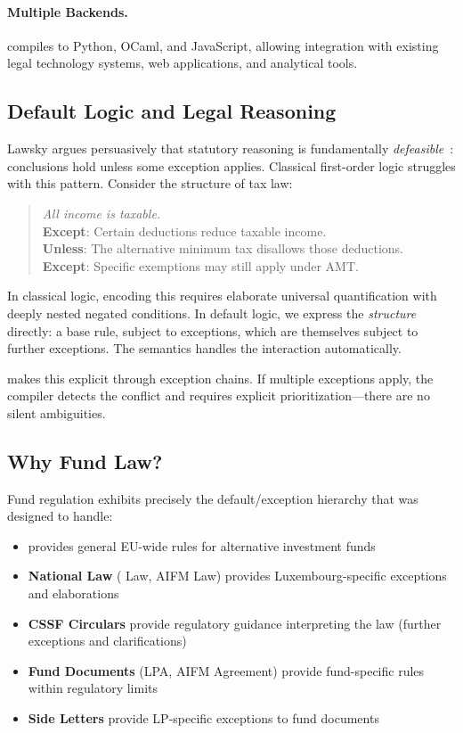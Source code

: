 \paragraph{Multiple Backends.} \catala{} compiles to Python, OCaml, and JavaScript, allowing integration with existing legal technology systems, web applications, and analytical tools.

\subsection{Default Logic and Legal Reasoning}
\label{sec:default-logic}

Lawsky argues persuasively that statutory reasoning is fundamentally \textit{defeasible}~\cite{lawsky2017logic}: conclusions hold unless some exception applies. Classical first-order logic struggles with this pattern. Consider the structure of tax law:

\begin{quote}
\textit{All income is taxable.}\\
\textbf{Except}: Certain deductions reduce taxable income.\\
\textbf{Unless}: The alternative minimum tax disallows those deductions.\\
\textbf{Except}: Specific exemptions may still apply under AMT.
\end{quote}

In classical logic, encoding this requires elaborate universal quantification with deeply nested negated conditions. In default logic, we express the \textit{structure} directly: a base rule, subject to exceptions, which are themselves subject to further exceptions. The semantics handles the interaction automatically.

\catala{} makes this explicit through exception chains. If multiple exceptions apply, the compiler detects the conflict and requires explicit prioritization---there are no silent ambiguities.

\subsection{Why Fund Law?}
\label{sec:why-fund-law}

Fund regulation exhibits precisely the default/exception hierarchy that \catala{} was designed to handle:

\begin{itemize}[nosep,leftmargin=1.5em]
  \item \textbf{\aifmd{}} provides general EU-wide rules for alternative investment funds
  \item \textbf{National Law} (\raif{} Law, AIFM Law) provides Luxembourg-specific exceptions and elaborations
  \item \textbf{CSSF Circulars} provide regulatory guidance interpreting the law (further exceptions and clarifications)
  \item \textbf{Fund Documents} (LPA, AIFM Agreement) provide fund-specific rules within regulatory limits
  \item \textbf{Side Letters} provide LP-specific exceptions to fund documents
\end{itemize}

